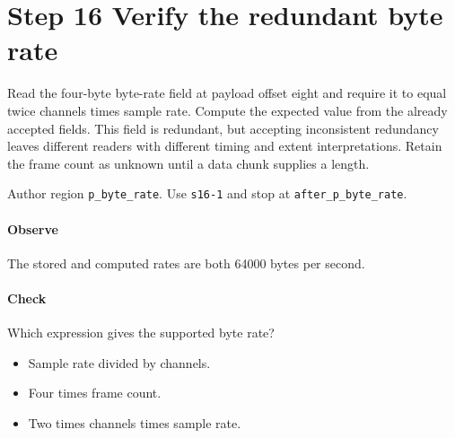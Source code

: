 \section{Step 16 Verify the redundant byte rate}\label{pcm-wav-s16}
Read the four-byte byte-rate field at payload offset eight and require it to equal twice channels times sample rate. Compute the expected value from the already accepted fields. This field is redundant, but accepting inconsistent redundancy leaves different readers with different timing and extent interpretations. Retain the frame count as unknown until a data chunk supplies a length.

Author region \texttt{p\_byte\_rate}. Use \texttt{s16-1} and stop at \texttt{after\_p\_byte\_rate}.

\paragraph{Observe} The stored and computed rates are both 64000 bytes per second.

\paragraph{Check} Which expression gives the supported byte rate?
\begin{itemize}
  \item[A.] Sample rate divided by channels.
  \item[B.] Four times frame count.
  \item[C.] Two times channels times sample rate.
\end{itemize}
